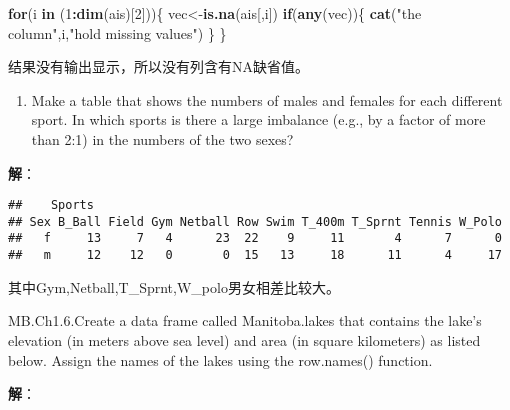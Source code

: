 \documentclass[
]{article}
\newenvironment{Shaded}{\begin{snugshade}}{\end{snugshade}}
\newcommand{\ControlFlowTok}[1]{\textcolor[rgb]{0.13,0.29,0.53}{\textbf{#1}}}
\newcommand{\DataTypeTok}[1]{\textcolor[rgb]{0.13,0.29,0.53}{#1}}
\newcommand{\DecValTok}[1]{\textcolor[rgb]{0.00,0.00,0.81}{#1}}
\newcommand{\KeywordTok}[1]{\textcolor[rgb]{0.13,0.29,0.53}{\textbf{#1}}}
\newcommand{\NormalTok}[1]{#1}
\newcommand{\OperatorTok}[1]{\textcolor[rgb]{0.81,0.36,0.00}{\textbf{#1}}}
\newcommand{\StringTok}[1]{\textcolor[rgb]{0.31,0.60,0.02}{#1}}
\providecommand{\tightlist}{%
  \setlength{\itemsep}{0pt}\setlength{\parskip}{0pt}}
\begin{document}
\begin{Shaded}
\begin{Highlighting}[]
\ControlFlowTok{for}\NormalTok{(i }\ControlFlowTok{in}\NormalTok{ (}\DecValTok{1}\OperatorTok{:}\KeywordTok{dim}\NormalTok{(ais)[}\DecValTok{2}\NormalTok{]))\{}
\NormalTok{    vec<-}\KeywordTok{is.na}\NormalTok{(ais[,i])}
    \ControlFlowTok{if}\NormalTok{(}\KeywordTok{any}\NormalTok{(vec))\{}
        \KeywordTok{cat}\NormalTok{(}\StringTok{"the column"}\NormalTok{,i,}\StringTok{"hold missing values"}\NormalTok{)}
\NormalTok{    \}}
\NormalTok{\}}
\end{Highlighting}
\end{Shaded}

结果没有输出显示，所以没有列含有NA缺省值。

\begin{enumerate}
\def\labelenumi{(\alph{enumi})}
\setcounter{enumi}{1}
\tightlist
\item
  Make a table that shows the numbers of males and females for each
  different sport. In which sports is there a large imbalance (e.g., by
  a factor of more than 2:1) in the numbers of the two sexes?
\end{enumerate}

\textbf{解}：

\begin{Shaded}
\end{Shaded}

\begin{verbatim}
##    Sports
## Sex B_Ball Field Gym Netball Row Swim T_400m T_Sprnt Tennis W_Polo
##   f     13     7   4      23  22    9     11       4      7      0
##   m     12    12   0       0  15   13     18      11      4     17
\end{verbatim}

其中Gym,Netball,T\_Sprnt,W\_polo男女相差比较大。

MB.Ch1.6.Create a data frame called Manitoba.lakes that contains the
lake's elevation (in meters above sea level) and area (in square
kilometers) as listed below. Assign the names of the lakes using the
row.names() function.

\textbf{解}：
\end{document}
